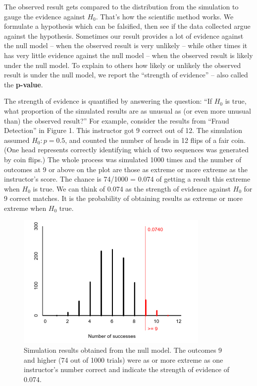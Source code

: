       The observed result gets compared to the distribution from the
      simulation to gauge the evidence against $H_0$.  That's
      how the scientific method works.  We formulate a hypothesis
      which can be falsified, then see if the data collected argue
      against the hypothesis. Sometimes our result provides a lot of
      evidence against the null model  -- when the observed result is very
      unlikely -- while other times it has very little evidence against
      the null model -- when the observed result is likely under the null
      model. To explain to others  how likely or unlikely the
      observed result is under the null model, we  report the
      ``strength of evidence'' -- also called the {\bf p-value}. 

      The strength of evidence is quantified by answering the
      question: ``If $H_0$ is true, what proportion of the simulated
      results are as unusual as (or even more unusual than) the
      observed result?'' 
      For example, consider the results from ``Fraud Detection''  in
      Figure 1. This instructor got 9 correct out of 12.  The
      simulation assumed $H_0: p = 0.5$, and counted the number of
      heads in 12 flips of a fair coin. (One head represents correctly
      identifying which of two sequences was generated by coin flips.)
      The whole process was simulated 1000 times and the number of
      outcomes at 9 or above on the plot are those as extreme or more
      extreme as the instructor's score. The chance is 74/1000 =
      0.074 of getting a result this extreme when $H_0$ is
      true.  We can think of 0.074 as the strength of evidence against
      $H_0$  for 9 correct matches. It is
      the probability of obtaining results as extreme or more extreme
      when $H_0$ true.
 \begin{figure}[h]
   \centering
  \includegraphics[width=.5\linewidth]{plots/StrOfEvidence-12Guesses.png}

   \caption{ Simulation results obtained from the null model. The
      outcomes 9 and higher (74 out of 1000 trials) were as or more extreme
      as one instructor's number correct and indicate the strength of
      evidence of 0.074. }
   \label{fig:SOE-12}
 \end{figure}


